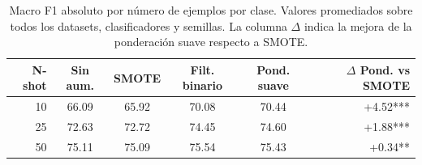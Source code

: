 \begin{table}[htbp]
\centering
\small
\caption{Macro F1 absoluto por número de ejemplos por clase. Valores promediados sobre todos los datasets, clasificadores y semillas. La columna $\Delta$ indica la mejora de la ponderación suave respecto a SMOTE.}
\label{tab:absolute_f1_by_nshot}
\begin{tabular}{rccccr}
\toprule
\textbf{N-shot} & \textbf{Sin aum.} & \textbf{SMOTE} & \textbf{Filt. binario} & \textbf{Pond. suave} & \textbf{$\Delta$ Pond. vs SMOTE} \\
\midrule
10 & 66.09 & 65.92 & 70.08 & 70.44 & +4.52*** \\
25 & 72.63 & 72.72 & 74.45 & 74.60 & +1.88*** \\
50 & 75.11 & 75.09 & 75.54 & 75.43 & +0.34** \\
\bottomrule
\end{tabular}
\end{table}